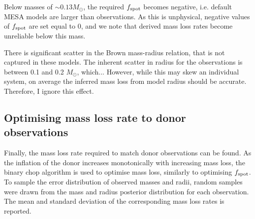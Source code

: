 Below masses of $\sim 0.13 M_\odot$, the required $f_{\rm spot}$ becomes negative, i.e. default MESA models are larger than observations. As this is unphysical, negative values of $f_{\rm spot}$ are set equal to 0, and we note that derived mass loss rates become unreliable below this mass.

There is significant scatter in the Brown mass-radius relation, that is not captured in these models. The inherent scatter in radius for the observations is  between 0.1 and 0.2 $M_\odot$, which...
However, while this may skew an individual system, on average the inferred mass loss from model radius should be accurate. Therefore, I ignore this effect. 


\subsection{Optimising mass loss rate to donor observations}
\label{sect:modelling:optimising mass loss rate to observations}

Finally, the mass loss rate required to match donor observations can be found. As the inflation of the donor increases monotonically with increasing mass loss, the binary chop algorithm is used to optimise mass loss, similarly to optimising $f_{\rm spot}$.
To sample the error distribution of observed masses and radii, random samples were drawn from the mass and radius posterior distribution for each observation. The mean and standard deviation of the corresponding mass loss rates is reported.
